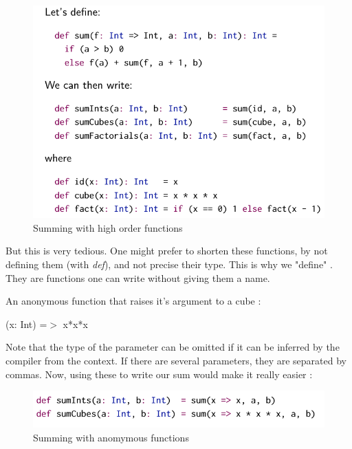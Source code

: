 \documentclass[12pt,a4paper]{article}
\begin{document}
\begin{figure}[h]
	\centering
	\includegraphics[scale=0.5]{images/sum_HighOrder}
	\caption{Summing with high order functions}
\end{figure}
But this is very tedious. One might prefer to shorten these functions, by not defining them (with \textit{def}), and not precise their type. This is why we "define" . They are functions one can write without giving them a name.
\begin{exemple}
		An anonymous function that raises it's argument to a cube : 
		\begin{code}
			(x: Int) =$>$ x*x*x
		\end{code}
\end{exemple}
Note that the type of the parameter can be omitted  if it can be inferred by the compiler from the context. If there are several parameters, they are separated by commas. Now, using these to write our sum would make it really easier :
\begin{figure}[h]
	\centering
	\includegraphics[scale=0.5]{images/sum_Anonymous}
	\caption{Summing with anomymous functions}
\end{figure}
\end{document}

